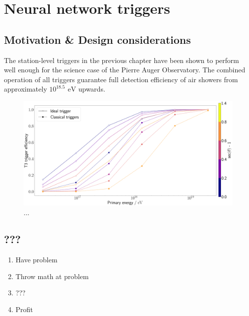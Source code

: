 
\chapter{Neural network triggers}
\label{chap:neural-network-triggers}

\section{Motivation \& Design considerations}
\label{sec:motivation}

The station-level triggers in the previous chapter have been shown to perform well enough for the science case of the Pierre Auger Observatory. The combined 
operation of all triggers guarantee full detection efficiency of air showers from approximately $10^{18.5}\,\SI{}{\electronvolt}$ upwards. 

\begin{figure}
	\centering
	\includegraphics[width=\textwidth]{./plots/ideal_t3_efficiency.png}
	\caption{...} 
	\label{fig:ideal-efficiency-comparison}
\end{figure}


\section{???}

\begin{enumerate}
    \item Have problem
    \item Throw math at problem
    \item ???
    \item Profit
\end{enumerate}

